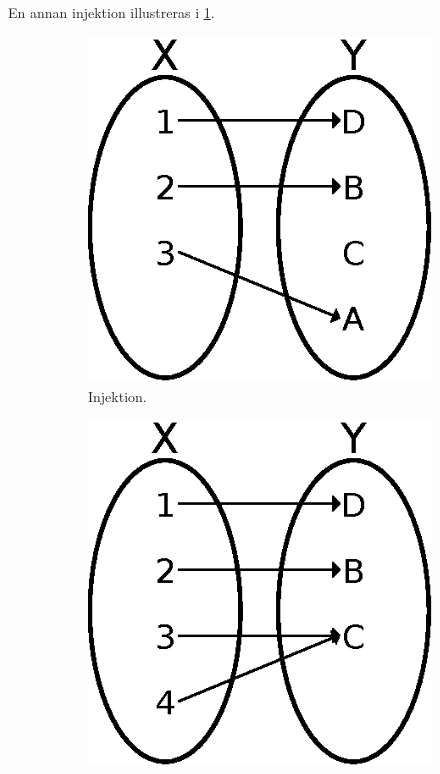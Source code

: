 En annan injektion illustreras i \cref{fig:Injektion}.
\begin{figure}
  \begin{subfigure}[t]{0.3\textwidth}
    \includegraphics[width=\linewidth]{figs/injection.eps}
    \caption{%
      Injektion.
    }\label{fig:Injektion}
  \end{subfigure}
  \hfill
  \begin{subfigure}[t]{0.3\textwidth}
    \includegraphics[width=\linewidth]{figs/surjection.eps}

\end{subfigure}
\end{figure}
